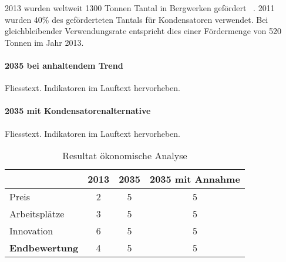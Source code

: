 2013 wurden weltweit 1300 Tonnen Tantal in Bergwerken gefördert ~\cite{tantal_price2}. 2011 wurden 40\% des geförderteten Tantals für Kondensatoren verwendet. Bei gleichbleibender Verwendungsrate entspricht dies einer Fördermenge von 520 Tonnen im Jahr 2013.
\\


\paragraph{2035 bei anhaltendem Trend}
Fliesstext. Indikatoren im Lauftext hervorheben.

\paragraph{2035 mit Kondensatorenalternative}
Fliesstext. Indikatoren im Lauftext hervorheben.

\begin{table}[h]
  \centering
  \begin{tabular}{l|ccc}            & \textbf{2013} & \textbf{2035} & \textbf{2035 mit Annahme}
    \\ \hline Preis                 & 2             & 5             & 5
    \\ Arbeitsplätze                & 3             & 5             & 5
    \\ Innovation                   & 6             & 5             & 5
    \\ \hline \textbf{Endbewertung} & 4             & 5             & 5
  \end{tabular}
  \caption{Resultat ökonomische Analyse}
\end{table}
